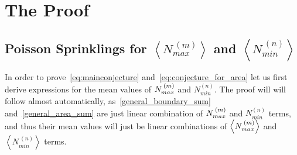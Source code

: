 \documentclass[12pt]{article}
\begin{document}

\section{The Proof}

\subsection{Poisson Sprinklings for $\left\langle N_{max}^{\:(m)}\right\rangle$ and $\left\langle N_{min}^{\: (n)}\right\rangle$}

In order to prove~\eqref{eq:mainconjecture} and~\eqref{eq:conjecture_for_area} let us first derive expressions for the mean values of $N_{\vphantom{i}max}^{\: (m)}$ and $N_{min}^{(n)}$. The proof will will follow almost automatically, as~\eqref{general_boundary_sum} and~\eqref{general_area_sum} are just linear combination of $N_{\vphantom{i}max}^{\: (m)}$ and $N_{min}^{(n)}$ terms, and thus their mean values will just be linear combinations of $\left\langle N_{\vphantom{i}max}^{\: (m)}\right\rangle$ and $\left\langle N_{min}^{\: (n)}\right\rangle$ terms.
\end{document}
